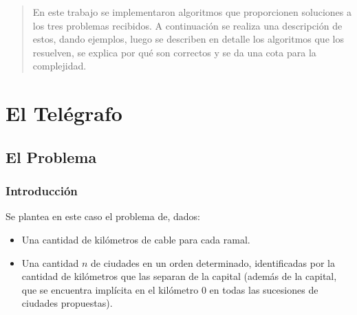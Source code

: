 \documentclass[spanish,a4paper]{article}
\begin{document}
\subtitulo{}

\fecha{\today}

\grupo{}


\maketitle

\thispagestyle{empty}
\vspace{3cm}
\tableofcontents
\newpage
\vfill

\begin{abstract}
En este trabajo se implementaron algoritmos que proporcionen soluciones a los tres problemas recibidos. A continuación se realiza una descripción de estos, dando ejemplos, luego se describen en detalle los algoritmos que los resuelven, se explica por qué son correctos y se da una cota para la complejidad.
\end{abstract}

\newpage



\section{El Telégrafo}

\subsection{El Problema}

\subsubsection{Introducción}
Se plantea en este caso el problema de, dados:
\begin{itemize}

\item Una cantidad de kilómetros de cable para cada ramal.

\item Una cantidad $n$ de ciudades en un orden determinado, identificadas por la cantidad de kilómetros que las separan de la capital (además de la capital, que se encuentra implícita en el kilómetro $0$ en todas las sucesiones de ciudades propuestas).

\end{itemize}
\end{document}
